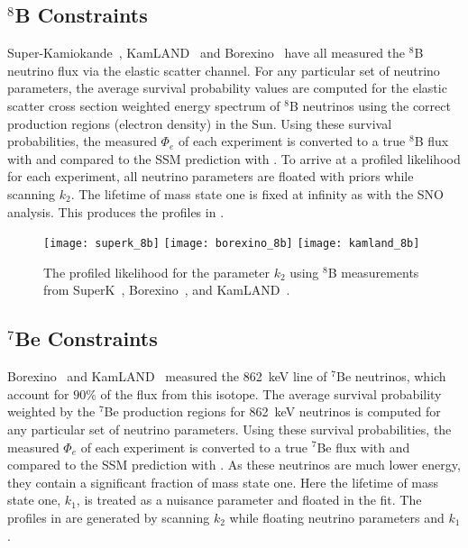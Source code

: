 \subsection{\texorpdfstring{$^8$B}{Boron-8} Constraints}

Super-Kamiokande~\cite{superkiv}, KamLAND~\cite{kamland8b} and Borexino~\cite{borexino8b} have all measured the $^8$B neutrino flux via the elastic scatter channel. 
For any particular set of neutrino parameters, the average survival probability values are computed for the elastic scatter cross section weighted energy spectrum of $^8$B neutrinos using the correct production regions (electron density) in the Sun. 
Using these survival probabilities, the measured $\Phi_e$ of each experiment is converted to a true $^8$B flux with  and compared to the SSM prediction with .
To arrive at a profiled likelihood for each experiment, all neutrino parameters are floated with priors while scanning $k_2$. The lifetime of mass state one is fixed at infinity as with the SNO analysis. 
This produces the profiles in .

\begin{figure}
\centering
\texttt{[image: superk\_8b]}
\texttt{[image: borexino\_8b]}
\texttt{[image: kamland\_8b]}
\caption{The profiled likelihood for the parameter $k_2$ using $^8$B measurements from SuperK~\cite{superkiv}, Borexino~\cite{borexino8b}, and KamLAND~\cite{kamland8b}.}
\label{fig:8b_profiles}
\end{figure}

\subsection{\texorpdfstring{$^7$Be}{Beryllium-7} Constraints}

Borexino~\cite{borexino7be} and KamLAND~\cite{kamland7be} measured the 862~keV line of $^7$Be neutrinos, which account for $90\%$ of the flux from this isotope. 
The average survival probability weighted by the $^7$Be production regions for 862~keV neutrinos is computed for any particular set of neutrino parameters.
Using these survival probabilities, the measured $\Phi_e$ of each experiment is converted to a true $^7$Be flux with  and compared to the SSM prediction with . 
As these neutrinos are much lower energy, they contain a significant fraction of mass state one. 
Here the lifetime of mass state one, $k_1$, is treated as a nuisance parameter and floated in the fit. 
The profiles in  are generated by scanning $k_2$ while floating neutrino parameters and $k_1$.

